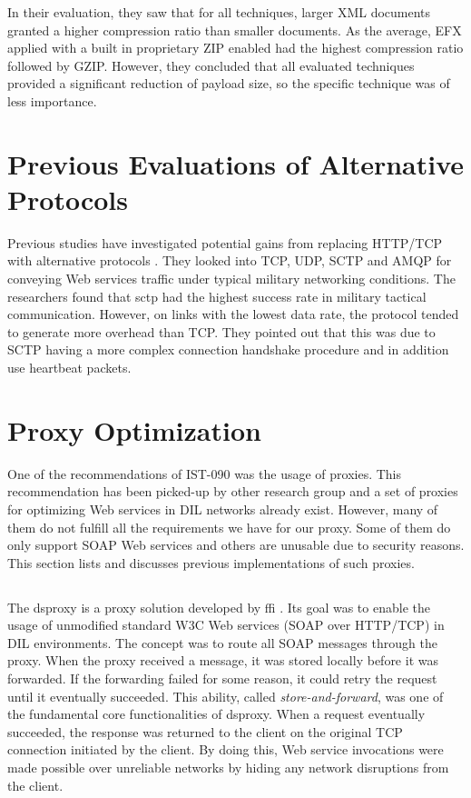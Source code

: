 In their evaluation, they saw that for all techniques, larger XML documents
granted a higher compression ratio than smaller documents. As the average, EFX
applied with a built in proprietary ZIP enabled had the highest compression
ratio followed by GZIP. However, they concluded that all evaluated techniques
provided a significant reduction of payload size, so the specific technique was
of less importance.


\section{Previous Evaluations of Alternative Protocols}

Previous studies have investigated potential gains from replacing HTTP/TCP with
alternative protocols \cite{evaluation-transport-protocols-web-services}. They
looked into TCP, UDP, SCTP and AMQP for conveying Web services traffic under
typical military networking conditions. The researchers found that \gls{sctp}
had the highest success rate in military tactical communication. However, on
links with the lowest data rate, the protocol tended to generate more overhead
than TCP. They pointed out that this was due to SCTP having a more complex
connection handshake procedure and in addition use heartbeat packets.

\section{Proxy Optimization}

One of the recommendations of IST-090 was the usage of proxies. This
recommendation has been picked-up by other research group and a set of proxies
for optimizing Web services in DIL networks already exist. However, many of them
do not fulfill all the requirements we have for our proxy. Some of them do
only support SOAP Web services and others are unusable due to security reasons.
This section lists and discusses previous implementations of such proxies.

\subsection{}

The \gls{dsproxy} is a proxy solution developed by
\gls{ffi} \cite{dsproxy-ffi}\cite{ieee-dsproxy}. Its goal was to enable the usage
of unmodified standard W3C Web services (SOAP over HTTP/TCP) in DIL
environments. The concept was to route all SOAP messages through the proxy. When
the proxy received a message, it was stored locally before it was forwarded. If
the forwarding failed for some reason, it could retry the request until it eventually succeeded.
This ability, called \textit{store-and-forward}, was one of the fundamental core
functionalities of \gls{dsproxy}. When a request eventually succeeded, the
response was returned to the client on the original TCP connection initiated by
the client. By doing this, Web service invocations were made possible over
unreliable networks by hiding any network disruptions from the client.


